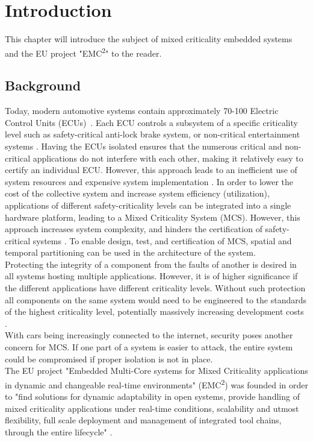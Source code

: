 \chapter{Introduction}
\label{sec:introduction}
This chapter will introduce the subject of mixed criticality embedded systems and the EU project "EMC\textsuperscript{2}" to the reader.

\section{Background}
Today, modern automotive systems contain approximately 70-100 Electric Control Units (ECUs)~\cite{lemke2012}. Each ECU controls a subsystem of a specific criticality level such as safety-critical anti-lock brake system, or non-critical entertainment systems \cite{weber2015}. Having the ECUs isolated ensures that the numerous critical and non-critical applications do not interfere with each other, making it relatively easy to certify an individual ECU. However, this approach leads to an inefficient use of system resources and expensive system implementation \cite{burns2016}. In order to lower the cost of the collective system and increase system efficiency (utilization), applications of different safety-criticality levels can be integrated into a single hardware platform, leading to a Mixed Criticality System (MCS). However, this approach increases system complexity, and hinders the certification of safety-critical systems \cite{zaki2016}. To enable design, test, and certification of MCS, spatial and temporal partitioning can be used in the architecture of the system.\\

Protecting the integrity of a component from the faults of another is desired in all systems hosting multiple applications. However, it is of higher significance if the different applications have different criticality levels. Without such protection all components on the same system would need to be engineered to the standards of the highest criticality level, potentially massively increasing development costs \cite{burns2016}.\\

With cars being increasingly connected to the internet, security poses another concern for MCS. If one part of a system is easier to attack, the entire system could be compromised if proper isolation is not in place.\\

The EU project "Embedded Multi-Core systems for Mixed Criticality applications in dynamic and changeable real-time environments" (EMC\textsuperscript{2}) was founded in order to "find solutions for dynamic adaptability in open systems, provide handling of mixed criticality applications under real-time conditions, scalability and utmost flexibility, full scale deployment and management of integrated tool chains, through the entire lifecycle" \cite{weber2015}. 

